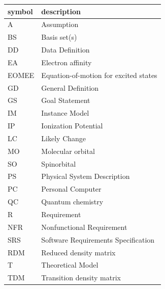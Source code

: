 \documentclass[12pt]{article}
\begin{document}
\renewcommand{\arraystretch}{1.2}
\begin{tabular}{l l} 
  \toprule		
  \textbf{symbol} & \textbf{description}\\
  \midrule 
  A & Assumption\\
  BS & Basis set(s)\\
  DD & Data Definition\\
  EA & Electron affinity\\
  EOMEE& Equation-of-motion for excited states\\
  GD & General Definition\\
  GS & Goal Statement\\
  IM & Instance Model\\
  IP & Ionization Potential\\
  LC & Likely Change\\
  MO & Molecular orbital\\
  SO & Spinorbital\\
  PS & Physical System Description\\
  PC & Personal Computer\\
  QC & Quantum chemistry\\
  R & Requirement\\
  NFR & Nonfunctional Requirement\\
  SRS & Software Requirements Specification\\
  RDM & Reduced density matrix\\
  T & Theoretical Model\\
  TDM & Transition density matrix\\
  \bottomrule
\end{tabular}\\


\newpage



\end{document}
